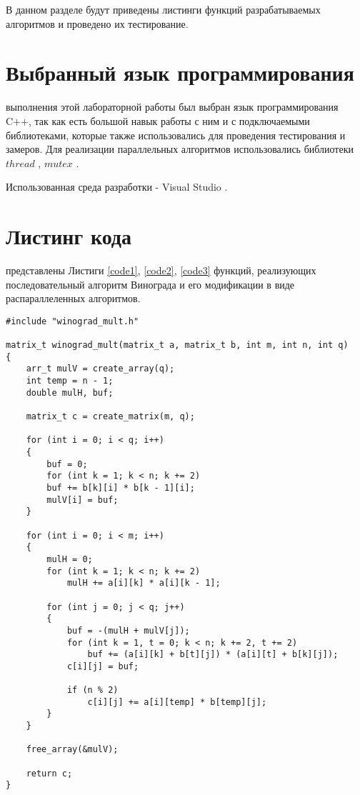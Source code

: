 В данном разделе будут приведены листинги функций разрабатываемых алгоритмов и проведено их тестирование.

\section{Выбранный язык программирования}
 выполнения этой лабораторной работы был выбран язык программирования C++, так как есть большой навык работы с ним и с подключаемыми библиотеками, которые также использовались для проведения тестирования и замеров. Для реализации параллельных алгоритмов использовались библиотеки $thread$ \cite{thread}, $mutex$ \cite{mutex}. 

Использованная среда разработки - Visual Studio \cite{Visual}.

\section{Листинг кода}
 представлены Листиги \ref{code1}, \ref{code2}, \ref{code3} функций, реализующих последовательный алгоритм Винограда и его модификации в виде распараллеленных алгоритмов.
\begin{lstlisting}[label=code1, caption = Последовательный алгоритм Винограда]
#include "winograd_mult.h"

matrix_t winograd_mult(matrix_t a, matrix_t b, int m, int n, int q)
{
	arr_t mulV = create_array(q);
	int temp = n - 1;
	double mulH, buf;
	
	matrix_t c = create_matrix(m, q);
	
	for (int i = 0; i < q; i++)
	{
		buf = 0;
		for (int k = 1; k < n; k += 2)
		buf += b[k][i] * b[k - 1][i];
		mulV[i] = buf;
	}
	
	for (int i = 0; i < m; i++)
	{
		mulH = 0;
		for (int k = 1; k < n; k += 2)
			mulH += a[i][k] * a[i][k - 1];
		
		for (int j = 0; j < q; j++)
		{
			buf = -(mulH + mulV[j]);
			for (int k = 1, t = 0; k < n; k += 2, t += 2)
				buf += (a[i][k] + b[t][j]) * (a[i][t] + b[k][j]);
			c[i][j] = buf;
			
			if (n % 2)
				c[i][j] += a[i][temp] * b[temp][j];
		}
	}
	
	free_array(&mulV);
	
	return c;
}
\end{lstlisting}


